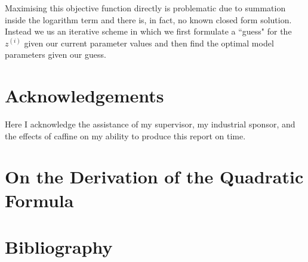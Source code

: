\documentclass[final,3p,times,twocolumn]{elsarticle}
\begin{document}
Maximising this objective function directly is problematic due to summation inside the logarithm term and there is, in fact, no known closed form solution.
Instead we us an iterative scheme in which we first formulate a ``guess" for the $z^{(i)}$ given our current parameter values and then find the optimal model parameters given our guess. 



\section*{Acknowledgements}
Here I acknowledge the assistance of my supervisor, my industrial sponsor,
and the effects of caffine on my ability to produce this report on time.

\appendix

\section{On the Derivation of the Quadratic Formula}
\label{app:quad}


\section*{Bibliography}








\end{document}
